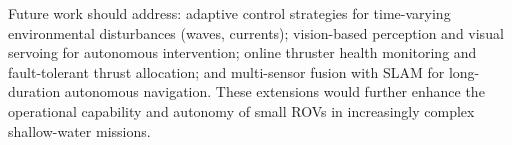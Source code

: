 \begin{digest}
Future work should address: adaptive control strategies for time-varying environmental disturbances (waves, currents); vision-based perception and visual servoing for autonomous intervention; online thruster health monitoring and fault-tolerant thrust allocation; and multi-sensor fusion with SLAM for long-duration autonomous navigation. These extensions would further enhance the operational capability and autonomy of small ROVs in increasingly complex shallow-water missions.

\end{digest}
